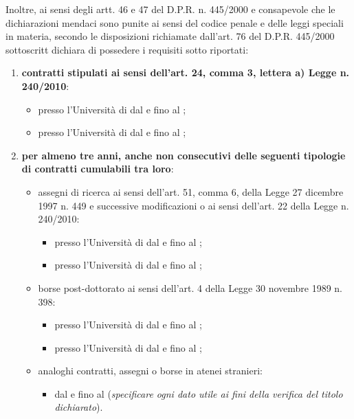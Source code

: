 Inoltre, ai sensi degli artt. 46 e 47 del D.P.R. n. 445/2000 e consapevole che 
le dichiarazioni mendaci sono punite ai sensi del codice penale e delle leggi 
speciali in materia, secondo le disposizioni richiamate dall’art. 76 del D.P.R. 
445/2000  \myTextField[.5cm]{} sottoscritt\myTextField[.5cm]{} dichiara di 
possedere i requisiti sotto riportati:
\begin{enumerate}
\item \textbf{contratti stipulati ai sensi dell'art. 24, comma 3, lettera a) 
Legge n. 240/2010}:
\begin{itemize}
 \item presso l’Università di \myTextField[3cm]{} dal \myTextField[2cm]{} e fino 
 al \myTextField[2cm]{};
 \item presso l’Università di \myTextField[3cm]{} dal \myTextField[2cm]{} e fino 
 al \myTextField[2cm]{};
\end{itemize}
\item \textbf{per almeno tre anni, anche non consecutivi delle seguenti tipologie 
di contratti cumulabili tra loro}:
\begin{itemize}
\item assegni di ricerca ai sensi dell’art. 51, comma 6, della Legge 27 dicembre
 1997 n. 449 e successive modificazioni o ai sensi dell’art. 22 della Legge n. 240/2010:
\begin{itemize}
 \item presso l’Università di \myTextField[3cm]{} dal \myTextField[2cm]{} e fino 
 al \myTextField[2cm]{};
 \item presso l’Università di \myTextField[3cm]{} dal \myTextField[2cm]{} e fino 
 al \myTextField[2cm]{};
\end{itemize}
\item borse post-dottorato ai sensi dell’art. 4 della Legge 30 novembre 1989 
n. 398:
\begin{itemize}
 \item presso l’Università di \myTextField[3cm]{} dal \myTextField[2cm]{} e fino 
 al \myTextField[2cm]{};
 \item presso l’Università di \myTextField[3cm]{} dal \myTextField[2cm]{} e fino 
 al \myTextField[2cm]{};
\end{itemize}
\item analoghi contratti, assegni o borse in atenei stranieri:
\begin{itemize}
\item dal \myTextField{} e fino al \myTextField{} (\emph{specificare ogni dato 
utile ai fini della verifica del titolo dichiarato}).

\end{itemize}
\end{itemize}
\end{enumerate}
